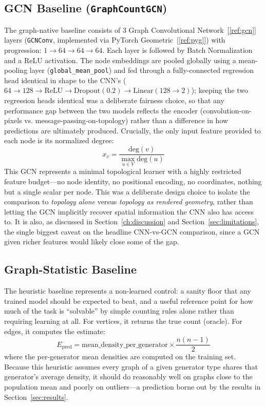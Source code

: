 \documentclass[11pt,letterpaper]{article}
\numberwithin{equation}{section}
\numberwithin{figure}{section}
\numberwithin{table}{section}
\begin{document}
\subsection{GCN Baseline (\texttt{GraphCountGCN})}
The graph-native baseline consists of 3 Graph Convolutional Network~[\ref{ref:gcn}] layers (\texttt{GCNConv}, implemented via PyTorch Geometric~[\ref{ref:pyg}]) with progression: $1 \rightarrow 64 \rightarrow 64 \rightarrow 64$.
Each layer is followed by Batch Normalization and a ReLU activation. The node embeddings are pooled globally using a mean-pooling layer (\texttt{global\_mean\_pool}) and fed through a fully-connected regression head identical in shape to the CNN's ($64 \rightarrow 128 \rightarrow \text{ReLU} \rightarrow \text{Dropout}(0.2) \rightarrow \text{Linear}(128 \rightarrow 2)$); keeping the two regression heads identical was a deliberate fairness choice, so that any performance gap between the two models reflects the encoder (convolution-on-pixels vs. message-passing-on-topology) rather than a difference in how predictions are ultimately produced.
Crucially, the only input feature provided to each node is its normalized degree:
\begin{equation*}
x_v = \frac{\text{deg}(v)}{\max_{u \in V} \text{deg}(u)}
\end{equation*}
This GCN represents a minimal topological learner with a highly restricted feature budget---no node identity, no positional encoding, no coordinates, nothing but a single scalar per node. This was a deliberate design choice to isolate the comparison to \emph{topology alone} versus \emph{topology as rendered geometry}, rather than letting the GCN implicitly recover spatial information the CNN also has access to. It is also, as discussed in Section~\ref{ch:discussion} and Section~\ref{sec:limitations}, the single biggest caveat on the headline CNN-vs-GCN comparison, since a GCN given richer features would likely close some of the gap.

\subsection{Graph-Statistic Baseline}
The heuristic baseline represents a non-learned control: a sanity floor that any trained model should be expected to beat, and a useful reference point for how much of the task is ``solvable'' by simple counting rules alone rather than requiring learning at all. For vertices, it returns the true count (oracle). For edges, it computes the estimate:
\begin{equation*}
E_{\text{pred}} = \text{mean\_density\_per\_generator} \times \frac{n(n-1)}{2}
\end{equation*}
where the per-generator mean densities are computed on the training set. Because this heuristic assumes every graph of a given generator type shares that generator's average density, it should do reasonably well on graphs close to the population mean and poorly on outliers---a prediction borne out by the results in Section~\ref{sec:results}.
\end{document}
